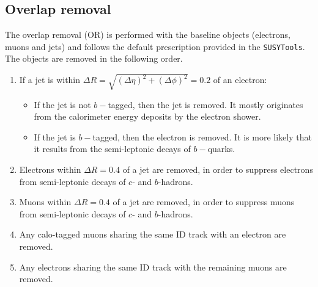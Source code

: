 \subsection{Overlap removal}
\label{sec:overlapRemoval}
The overlap removal (OR) is performed with the baseline objects (electrons, muons and jets) and follows the default prescription provided in the \texttt{SUSYTools}.
The objects are removed in the following order.
\begin{enumerate}
\item If a jet is within $\Delta R= \sqrt{(\Delta \eta)^2 + (\Delta \phi)^2}=0.2$ of an electron:
\begin{itemize}
\item If the jet is not $b-$tagged, then the jet is removed. It mostly originates from the calorimeter energy deposits by the electron shower.
\item If the jet is $b-$tagged, then the electron is removed. It is more likely that it results from the semi-leptonic decays of $b-$quarks.
\end{itemize}
\item Electrons within $\Delta R=0.4$ of a jet are removed, in order to suppress electrons from semi-leptonic decays of $c$- and $b$-hadrons.
\item Muons within $\Delta R=0.4$ of a jet are removed, in order to suppress muons from semi-leptonic decays of $c$- and $b$-hadrons.
\item Any calo-tagged muons sharing the same ID track with an electron are removed.
\item Any electrons sharing the same ID track with the remaining muons are removed.
\end{enumerate}
